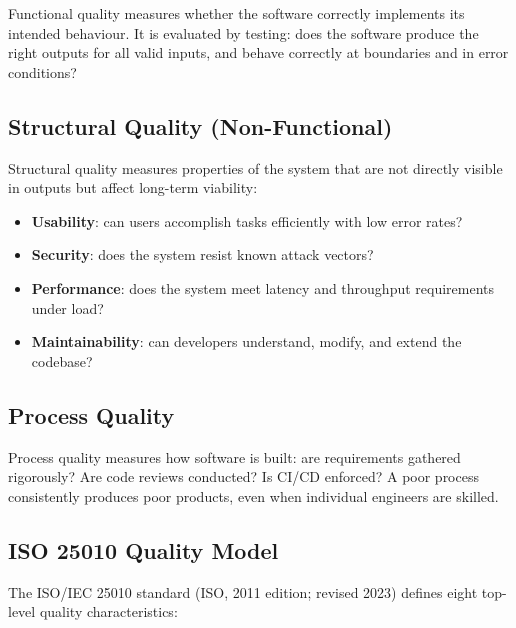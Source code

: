 \documentclass[11pt,a4paper]{book}
\begin{document}
Functional quality measures whether the software correctly implements its intended behaviour. It is evaluated by testing: does the software produce the right outputs for all valid inputs, and behave correctly at boundaries and in error conditions?

\subsection{Structural Quality (Non-Functional)}

Structural quality measures properties of the system that are not directly visible in outputs but affect long-term viability:

\begin{itemize}
  \item \textbf{Usability}: can users accomplish tasks efficiently with low error rates?
  \item \textbf{Security}: does the system resist known attack vectors?
  \item \textbf{Performance}: does the system meet latency and throughput requirements under load?
  \item \textbf{Maintainability}: can developers understand, modify, and extend the codebase?
\end{itemize}

\subsection{Process Quality}

Process quality measures how software is built: are requirements gathered rigorously? Are code reviews conducted? Is CI/CD enforced? A poor process consistently produces poor products, even when individual engineers are skilled.

\subsection{ISO 25010 Quality Model}

The ISO/IEC 25010 standard (ISO, 2011 edition; revised 2023) defines eight top-level quality characteristics:
\end{document}
